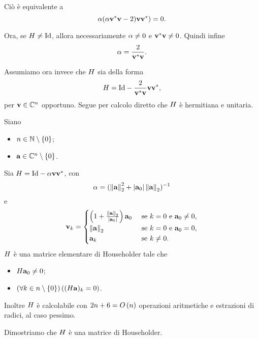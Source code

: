 Ci\`o \`e equivalente a
\[
  \alpha(\alpha{\mathbf{v}}^*\mathbf{v} - 2)\mathbf{v}{\mathbf{v}}^*)
  = 0.
\]
\par Ora, se $\HouseholderElementaryMatrix \neq \Identity$, allora necessariamente
$\alpha \neq 0$ e ${\mathbf{v}}^*{\mathbf{v}} \neq 0$. Quindi infine
\[
  \alpha = \frac{2}{{\mathbf{v}}^*\mathbf{v}}.
\]
\par Assumiamo ora invece che $H$ sia della forma
\[
  \HouseholderElementaryMatrix
  = \Identity
  - \frac{2}{\HermitianTransposed{\Vector}\Vector}
  \Vector\HermitianTransposed{\Vector},
\]
per $\mathbf{v} \in \mathbb{C}^n$ opportuno.
Segue per calcolo diretto che $H$ \`e hermitiana e unitaria. \EndProof
\begin{Theorem}
  \label{th_Householder}
  Siano
  \begin{itemize}
    \item $n \in \mathbb{N} \setminus \lbrace 0 \rbrace$;
    \item $\mathbf{a} \in \mathbb{C}^n \setminus \lbrace 0 \rbrace$.
  \end{itemize}
  Sia
  $\HouseholderElementaryMatrix
  = \Identity - \Scalar \Vector\HermitianTransposed{\Vector}$,
  con
  \[
    \Scalar = (\Norm{\VarVarVector}[2]^2
      + \AbsoluteValue{\VarVarVector_0} \Norm{\VarVarVector}[2])^{-1}
  \]
  e
  \[
    \Vector_k =
    \begin{cases}
      \left ( 1 + \frac{\Norm{\VarVarVector}[2]}{\AbsoluteValue{\VarVarVector_0}} \right )
        \VarVarVector_0&\text{ se }k = 0\text{ e }\VarVarVector_0 \neq 0,\\
      \Norm{\VarVarVector}[2]&\text{ se }k = 0\text{ e }\VarVarVector_0 = 0,\\
      \VarVarVector_k&\text{ se }k \neq 0.
    \end{cases}
  \]
  $H$ \`e una matrice elementare di Householder tale che
  \begin{itemize}
    \item $H\mathbf{a}_0 \neq 0$;
    \item $\left ( \forall k \in n \setminus \lbrace 0 \rbrace \right ) \left ( (H\mathbf{a})_k = 0 \right )$.
  \end{itemize}
  Inoltre $H$ \`e calcolabile con
  $2n + 6 = O \left ( n \right )$ operazioni aritmetiche e estrazioni di radici, al caso pessimo.
\end{Theorem}
\Proof Dimostriamo che $H$ \`e una matrice di Householder.
